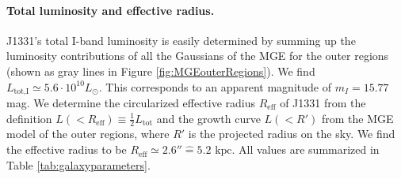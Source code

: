 \paragraph{Total luminosity and effective radius.} J1331's total I-band luminosity is easily determined by summing up the luminosity contributions of all the Gaussians of the MGE for the outer regions (shown as gray lines in Figure \ref{fig:MGEouterRegions}). We find $L_\text{tot,I} \simeq 5.6 \cdot 10^{10} L_\odot$. This corresponds to an apparent magnitude of $m_I = 15.77$ mag. We determine the circularized effective radius $R_\text{eff}$ of J1331 from the definition $L(<R_\text{eff}) \equiv \frac 12 L_\text{tot}$ and the growth curve $L(<R')$ from the MGE model of the outer regions, where $R'$ is the projected radius on the sky. We find the effective radius to be $R_\text{eff} \simeq 2.6'' \hat{=} 5.2 \text{ kpc}$.  All values are summarized in Table \ref{tab:galaxyparameters}.


